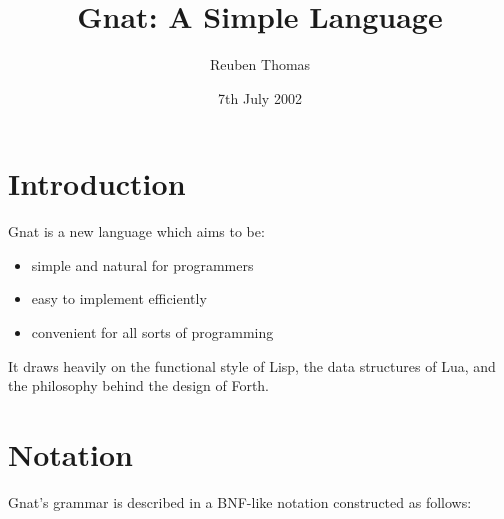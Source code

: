 \documentclass[english]{article}
\begin{document}
\title{Gnat: A Simple Language}
\author{Reuben Thomas}
\date{7th July 2002}
\maketitle



\section{Introduction}

Gnat is a new language which aims to be:

\begin{itemize}
\item simple and natural for programmers
\item easy to implement efficiently
\item convenient for all sorts of programming
\end{itemize}

It draws heavily on the functional style of Lisp, the data
structures of Lua, and the philosophy behind the design of Forth.



\section{Notation}

Gnat's grammar is described in a BNF-like notation constructed as
follows:
\end{document}
